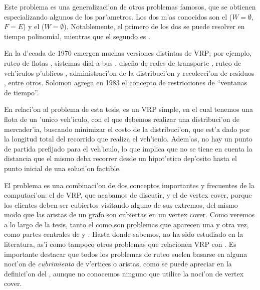 
\noindent
Este problema es una generalizaci'on de otros problemas famosos, que se obtienen especializando algunos de los par'ametros. Los dos m'as conocidos son el  ($W = \emptyset$, $F = E$) y el  ($W = \emptyset$). Notablemente, el primero de los dos se puede resolver en tiempo polinomial, mientras que el segundo es  \cite{Le76}.

En la d'ecada de 1970 emergen muchas versiones distintas de VRP; por ejemplo, ruteo de flotas \cite{Le71}, sistemas dial-a-bus \cite{WiSu}, dise\~no de redes de transporte \cite{OCWa}, ruteo de veh'iculos p'ublicos \cite{Ma70}, administraci'on de la distribuci'on \cite{Ei74} y recolecci'on de residuos \cite{Li}, entre otros. Solomon \cite{So83} agrega en 1983 el concepto de restricciones de ``ventanas de tiempo''.

En relaci'on al problema de esta tesis,  es un VRP simple, en el cual tenemos una flota de un 'unico veh'iculo, con el que debemos realizar una distribuci'on de mercader'ia, buscando minimizar el costo de la distribuci'on, que est'a dado por la longitud total del recorrido que realiza el veh'iculo. Adem'as, no hay un punto de partida prefijado para el veh'iculo, lo que implica que no se tiene en cuenta la distancia que el mismo deba recorrer desde un hipot'etico dep'osito hasta el punto inicial de una soluci'on factible.

El problema  es una combinaci'on de dos conceptos importantes y frecuentes de la computaci'on: el de VRP, que acabamos de discutir, y el de vertex cover, porque los clientes deben ser cubiertos visitando alguno de sus extremos, del mismo modo que las aristas de un grafo son cubiertas en un vertex cover. Como veremos a lo largo de la tesis, tanto el  como  son problemas que aparecen una y otra vez, como partes centrales de  y . Hasta donde sabemos,  no ha sido estudiado en la literatura, as'i como tampoco otros problemas que relacionen VRP con . Es importante destacar que todos los problemas de ruteo suelen basarse en alguna noci'on de \textit{cubrimiento} de v'ertices o aristas, como se puede apreciar en la definici'on del , aunque no conocemos ninguno que utilice la noci'on de vertex cover.

